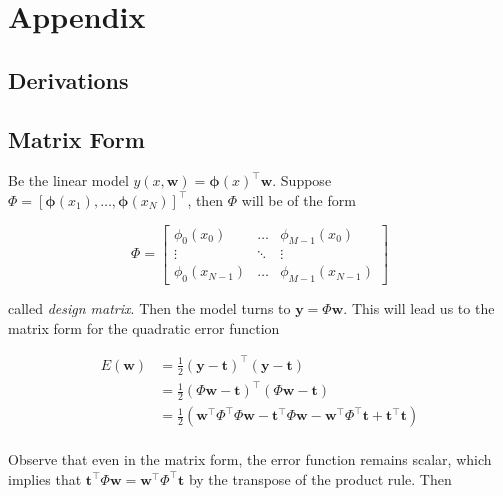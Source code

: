 \section*{\LARGE{Appendix}}

\begin{appendices}
  \vspace{4em}
  \section{Derivations}
  
  \subsection{Matrix Form}
  \label{subsec:app-matrix-form}
  
  Be the linear model $y(x,\mathbf{w}) = \boldsymbol{\phi}(x)^\top \mathbf{w}$. Suppose $\Phi = \left[ \boldsymbol{\phi}(x_1),\dots,\boldsymbol{\phi}(x_N) \right]^\top$, then $\Phi$ will be of the form


\begin{equation}
    \Phi =
    \begin{bmatrix}
      \phi_0(x_0) & \dots & \phi_{M-1}(x_{0}) \\
      \vdots & \ddots & \vdots \\
      \phi_{0}(x_{N-1}) & \dots & \phi_{M-1}(x_{N-1})
    \end{bmatrix}
\end{equation}

called \textit{design matrix}. Then the model turns to $\mathbf{y} = \Phi \mathbf{w}$. This will lead us to the matrix form for the quadratic error function

\begin{align*}
  E(\mathbf{w}) &= \frac{1}{2}(\mathbf{y} - \mathbf{t})^\top (\mathbf{y} - \mathbf{t}) \\
                &= \frac{1}{2}(\Phi \mathbf{w} - \mathbf{t})^\top (\Phi \mathbf{w} - \mathbf{t}) \\
                &= \frac{1}{2}(\mathbf{w}^\top \Phi^\top \Phi \mathbf{w}  - \mathbf{t}^\top \Phi \mathbf{w} - \mathbf{w}^\top \Phi^\top \mathbf{t} + \mathbf{t}^\top \mathbf{t}) \nonumber \\
\end{align*}

Observe that even in the matrix form, the error function remains scalar, which implies that $\mathbf{t}^\top \Phi \mathbf{w} = \mathbf{w}^\top \Phi^\top \mathbf{t}$ by the transpose of the product rule. Then


\end{appendices}
